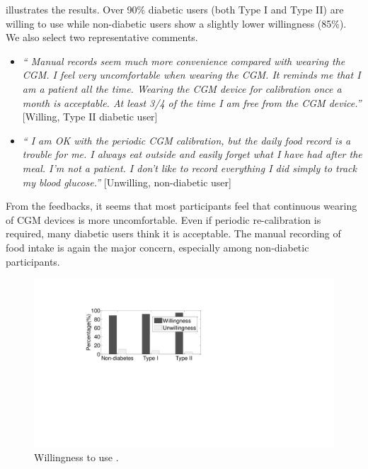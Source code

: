 { illustrates the results.
Over 90\% diabetic users (both Type I and Type II) are willing to use \sysname while non-diabetic users show a slightly lower willingness (85\%).
We also select two representative comments.
\begin{itemize}
  \item 
  \textit{``
  Manual records seem much more convenience compared with wearing the CGM.
  I feel very uncomfortable when wearing the CGM.
  It reminds me that I am a patient all the time.
  Wearing the CGM device for calibration once a month is acceptable. 
  At least 3/4 of the time I am free from the CGM device.''}
  [Willing, Type II diabetic user]
  \item 
  \textit{``
  I am OK with the periodic CGM calibration, but the daily food record is a trouble for me. 
  I always eat outside and easily forget what I have had after the meal. 
  I'm not a patient.
  I don't like to record everything I did simply to track my blood glucose.''}
  [Unwilling, non-diabetic user]
\end{itemize}
From the feedbacks, it seems that most participants feel that continuous wearing of CGM devices is more uncomfortable.
Even if periodic re-calibration is required, many diabetic users think it is acceptable.
The manual recording of food intake is again the major concern, especially among non-diabetic participants.

\begin{figure}[h]
  \centering
  \includegraphics[width=0.5\columnwidth]{./img/willingness.pdf}
  \caption{Willingness to use \sysname.}
  \label{fig:user_willingness}
\end{figure}


}

